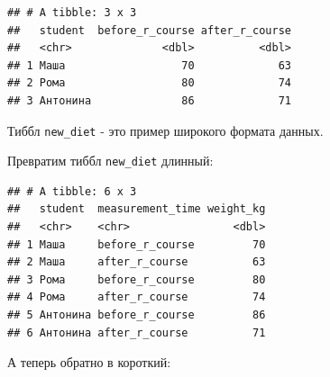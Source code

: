 \documentclass[]{book}
\newenvironment{Shaded}{\begin{snugshade}}{\end{snugshade}}
\newcommand{\KeywordTok}[1]{\textcolor[rgb]{0.13,0.29,0.53}{\textbf{#1}}}
\newcommand{\DataTypeTok}[1]{\textcolor[rgb]{0.13,0.29,0.53}{#1}}
\newcommand{\StringTok}[1]{\textcolor[rgb]{0.31,0.60,0.02}{#1}}
\newcommand{\OperatorTok}[1]{\textcolor[rgb]{0.81,0.36,0.00}{\textbf{#1}}}
\newcommand{\NormalTok}[1]{#1}
\begin{document}
\begin{verbatim}
## # A tibble: 3 x 3
##   student  before_r_course after_r_course
##   <chr>              <dbl>          <dbl>
## 1 Маша                  70             63
## 2 Рома                  80             74
## 3 Антонина              86             71
\end{verbatim}

Тиббл \texttt{new\_diet} - это пример широкого формата данных.

Превратим тиббл \texttt{new\_diet} длинный:

\begin{Shaded}
\end{Shaded}

\begin{verbatim}
## # A tibble: 6 x 3
##   student  measurement_time weight_kg
##   <chr>    <chr>                <dbl>
## 1 Маша     before_r_course         70
## 2 Маша     after_r_course          63
## 3 Рома     before_r_course         80
## 4 Рома     after_r_course          74
## 5 Антонина before_r_course         86
## 6 Антонина after_r_course          71
\end{verbatim}

А теперь обратно в короткий:

\begin{Shaded}
\end{Shaded}
\end{document}
